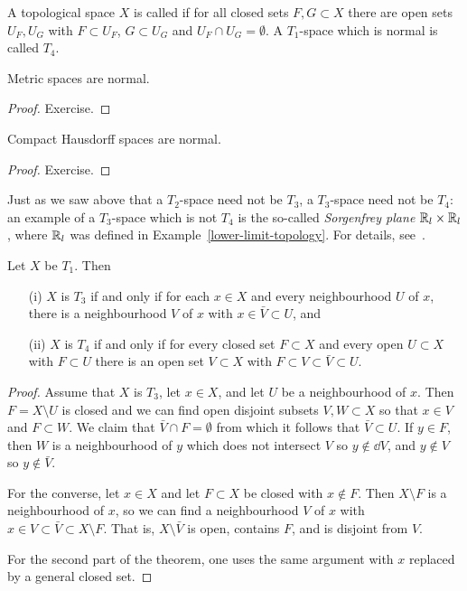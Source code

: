 \begin{defn}
  A topological space $X$ is called  if for all closed sets $F,G \subset X$ there are open sets $U_F, U_G$ with $F \subset U_F$, $G \subset U_G$ and $U_F \cap U_G = \emptyset$. A $T_1$-space which is normal is called $T_4$.
\end{defn}
\begin{prop}
  \label{metric-spaces-normal}
  Metric spaces are normal.
\end{prop}
\begin{proof}
  Exercise.
\end{proof}
\begin{prop}
  Compact Hausdorff spaces are normal.
\end{prop}
\begin{proof}
  Exercise.
\end{proof}
\begin{example}
  Just as we saw above that a $T_2$-space need not be $T_3$, a $T_3$-space need not be $T_4$: an example of a $T_3$-space which is not $T_4$ is the so-called \emph{Sorgenfrey plane} $\mathbb{R}_l \times \mathbb{R}_l$, where $\mathbb{R}_l$ was defined in Example~\ref{lower-limit-topology}. For details, see~\cite[\S 31, Example 3]{Mun}.
\end{example}

\begin{lem}
  \label{separation-squeeze-lemma}
  Let $X$ be $T_1$. Then
  \begin{itemize}
    \item[(i)] $X$ is $T_3$ if and only if for each $x \in X$ and every neighbourhood $U$ of $x$, there is a neighbourhood $V$ of $x$ with $x \in \bar V \subset U$, and
    \item[(ii)] $X$ is $T_4$ if and only if for every closed set $F \subset X$ and every open $U \subset X$ with $F \subset U$ there is an open set $V \subset X$ with $F \subset V \subset \bar V \subset U$.
  \end{itemize}
\end{lem}
\begin{proof}
  Assume that $X$ is $T_3$, let $x \in X$, and let $U$ be a neighbourhood of $x$. Then $F = X \setminus U$ is closed and we can find open disjoint subsets $V,W \subset X$ so that $x \in V$ and $F \subset W$. We claim that $\bar V \cap F = \emptyset$ from which it follows that $\bar V \subset U$. If $y \in F$, then $W$ is a neighbourhood of $y$ which does not intersect $V$ so $y \notin \dd V$, and $y \notin V$ so $y \notin \bar V$.
  
  For the converse, let $x \in X$ and let $F \subset X$ be closed with $x \notin F$. Then $X \setminus F$ is a neighbourhood of $x$, so we can find a neighbourhood $V$ of $x$ with $x \in V \subset \bar V \subset X \setminus F$. That is, $X \setminus \bar V$ is open, contains $F$, and is disjoint from $V$.
  
  For the second part of the theorem, one uses the same argument with $x$ replaced by a general closed set.
\end{proof}

